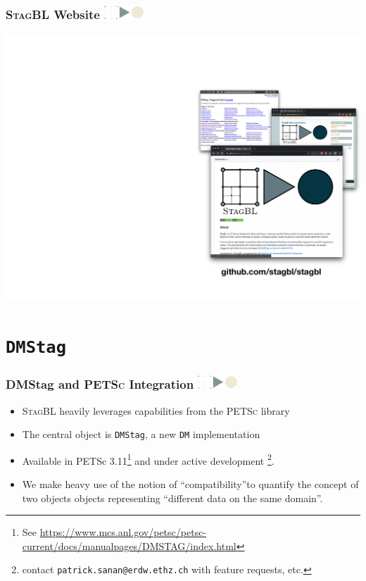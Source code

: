\documentclass{beamer}
\newcommand\frametitlelogo[1]{\frametitle{#1\hspace{0pt plus 1 filll} \includegraphics[width=42pt]{logo_slides}}}
\newcommand{\PETSc}{\textsc{PETSc}}
\newcommand{\StagBL}{\textsc{StagBL}}
\begin{document}
\begin{frame}[fragile]
\frametitlelogo{\StagBL{} Website}
\begin{center}
  \includegraphics[height=0.8\textheight]{images/websites.pdf}
\end{center}
\end{frame}

\section{\texttt{DMStag}}

\begin{frame}[fragile]
\frametitlelogo{DMStag and \PETSc{} Integration}
\begin{itemize}
\item  \StagBL{} heavily leverages capabilities from the \PETSc{} library
\item The central object is \lstinline{DMStag}, a new \lstinline{DM} implementation
\item Available in PETSc 3.11\footnote{See \url{https://www.mcs.anl.gov/petsc/petsc-current/docs/manualpages/DMSTAG/index.html}} and under active development \footnote{contact \texttt{patrick.sanan@erdw.ethz.ch} with feature requests, etc.}.
\item We make heavy use of the notion of ``compatibility''to quantify the concept of two objects objects representing ``different data on the same domain''.
\end{itemize}
\end{frame}
\end{document}
